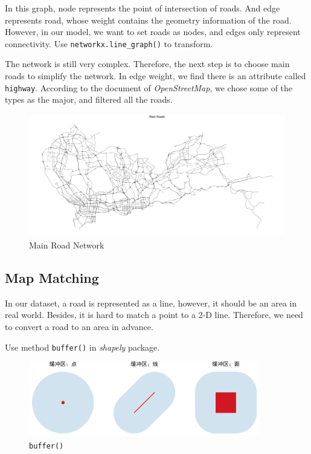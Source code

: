 \documentclass[fontset=none]{ctexart}
\theoremstyle{definition}
\theoremstyle{remark}
\begin{document}
In this graph, node represents the point of intersection of roads. And edge represents road, whose
weight contains the geometry information of the road. However, in our model, we want to set roads as nodes,
and edges only represent connectivity. Use \texttt{networkx.line\_graph()} to transform.

\clearpage
The network is still very complex. Therefore, the next step is to choose main roads to simplify the network.
In edge weight, we find there is an attribute called \texttt{highway}. According to the document of \textit{OpenStreetMap},
we chose some of the types as the major, and filtered all the roads.

\begin{figure}[htb]
  \centering
  \includegraphics[width=\textwidth]{images/7-4-2.png}
  \caption{Main Road Network}
  \label{fig: mrn}
\end{figure}

\subsection{Map Matching}
In our dataset, a road is represented as a line, however, it should be an area in real world.
Besides, it is hard to match a point to a 2-D line. Therefore, we need to convert a road to an area in advance.

Use method \texttt{buffer()} in \textit{shapely} package.
\begin{figure}[htb]
  \centering
  \includegraphics[width=0.9\textwidth]{images/buffer_example.png}
  \caption{\texttt{buffer()}}
  \label{fig: buffer}
\end{figure}
\end{document}
